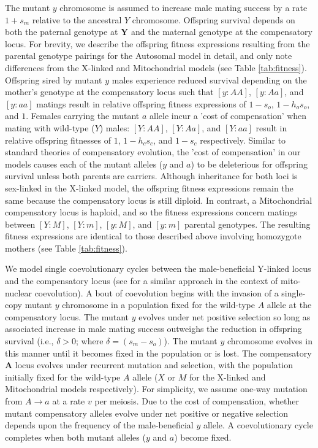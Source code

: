 \documentclass{article}
\begin{document}
The mutant $y$ chromosome is assumed to increase male mating success by a rate $1 + s_m$ relative to the ancestral $Y$ chromosome. Offspring survival depends on both the paternal genotype at $\mathbf{Y}$ and the maternal genotype at the compensatory locus. For brevity, we describe the offspring fitness expressions resulting from the parental genotype pairings for the Autosomal model in detail, and only note differences from the X-linked and Mitochondrial models (see Table \ref{tab:fitness}). Offspring sired by mutant $y$ males experience reduced survival depending on the mother's genotype at the compensatory locus such that $[y:AA]$, $[y:Aa]$, and $[y:aa]$ matings result in relative offspring fitness expressions of $1 - s_o$, $1 - h_o s_o$, and $1$. Females carrying the mutant $a$ allele incur a 'cost of compensation' when mating with wild-type ($Y$) males: $[Y:AA]$, $[Y:Aa]$, and $[Y:aa]$ result in relative offspring fitnesses of $1$, $1 - h_c s_c$, and $1 - s_c$ respectively. Similar to standard theories of compensatory evolution, the 'cost of compensation' in our models causes each of the mutant alleles ($y$ and $a$) to be deleterious for offspring survival unless both parents are carriers. Although inheritance for both loci is sex-linked in the X-linked model, the offspring fitness expressions remain the same because the compensatory locus is still diploid. In contrast, a Mitochondrial compensatory locus is haploid, and so the fitness expressions concern matings between $[Y:M]$, $[Y:m]$, $[y:M]$, and $[y:m]$ parental genotypes. The  resulting fitness expressions are identical to those described above involving homozygote mothers (see Table \ref{tab:fitness}).

We model single coevolutionary cycles between the male-beneficial Y-linked locus and the compensatory locus (see \citealt{ConnallonDowling2017} for a similar approach in the context of mito-nuclear coevolution). A bout of coevolution begins with the invasion of a single-copy mutant $y$ chromosome in a population fixed for the wild-type $A$ allele at the compensatory locus. The mutant $y$ evolves under net positive selection so long as associated increase in male mating success outweighs the reduction in offspring survival (i.e., $\delta > 0$; where $\delta = (s_m - s_o)$). The mutant $y$ chromosome evolves in this manner until it becomes fixed in the population or is lost. The compensatory $\mathbf{A}$ locus evolves under recurrent mutation and selection, with the population initially fixed for the wild-type $A$ allele ($X$ or $M$ for the X-linked and Mitochondrial models respectively). For simplicity, we assume one-way mutation from $A \rightarrow a$ at a rate $v$ per meiosis. Due to the cost of compensation, whether mutant compensatory alleles evolve under net positive or negative selection depends upon the frequency of the male-beneficial $y$ allele. A coevolutionary cycle completes when both mutant alleles ($y$ and $a$) become fixed.
\end{document}
